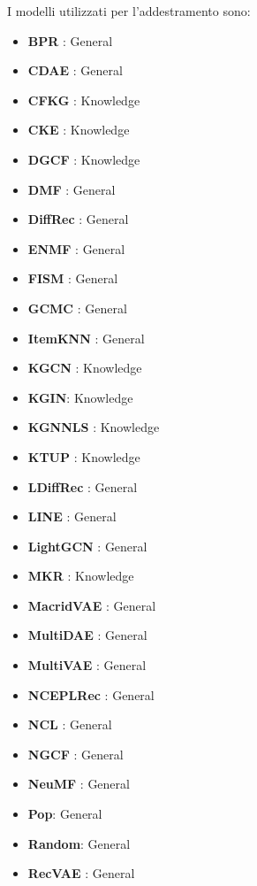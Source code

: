 \noindent I modelli utilizzati per l'addestramento sono:
\begin{itemize}
    \item \textbf{BPR} \cite{BPR}: General
    \item \textbf{CDAE} \cite{CDAE}: General
    \item \textbf{CFKG} \cite{CFKG}: Knowledge
    \item \textbf{CKE} \cite{CKE}: Knowledge
    \item \textbf{DGCF} \cite{DGCF}: Knowledge
    \item \textbf{DMF} \cite{DMF}: General
    \item \textbf{DiffRec} \cite{DiffRec}: General
    \item \textbf{ENMF} \cite{ENMF}: General 
    \item \textbf{FISM} \cite{FISM}: General
    \item \textbf{GCMC} \cite{GCMC}: General
    \item \textbf{ItemKNN} \cite{ItemKNN}: General
    \item \textbf{KGCN} \cite{KGCN}: Knowledge
    \item \textbf{KGIN}: \cite{KGIN} Knowledge
    \item \textbf{KGNNLS} \cite{KGNNLS}: Knowledge
    \item \textbf{KTUP} \cite{KTUP}: Knowledge
    \item \textbf{LDiffRec} \cite{LDiffRec}: General
    \item \textbf{LINE} \cite{LINE}: General
    \item \textbf{LightGCN} \cite{LightGCN}: General
    \item \textbf{MKR} \cite{MKR}: Knowledge
    \item \textbf{MacridVAE} \cite{MacridVAE}: General
    \item \textbf{MultiDAE} \cite{MultiDAE}: General
    \item \textbf{MultiVAE} \cite{MultiVAE}: General
    \item \textbf{NCEPLRec} \cite{NCEPLRec}: General
    \item \textbf{NCL} \cite{NCL}: General
    \item \textbf{NGCF} \cite{NGCF}: General
    \item \textbf{NeuMF} \cite{NeuMF}: General
    \item \textbf{Pop}: General
    \item \textbf{Random}: General
    \item \textbf{RecVAE} \cite{RecVAE}: General

\end{itemize}
